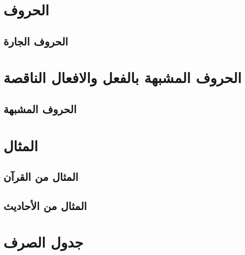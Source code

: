 \documentclass[11pt,twoside]{book}
\begin{document}


\chapter{الحروف}

\section{الحروف الجارة}



\chapter{الحروف المشبهة بالفعل والافعال الناقصة}

\section{الحروف المشبهة}



\chapter{المثال}

\section{المثال من القرآن}



\section{المثال من الأحاديث}



\appendix

\chapter{جدول الصرف}





\backmatter

\printbibliography
\end{document}
